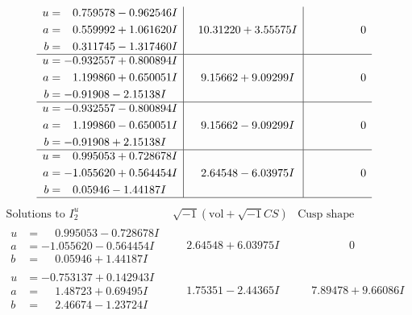 \documentclass[1p]{elsarticle_modified}
\theoremstyle{definition}
\newcommand{\I}{\sqrt{-1}}
\begin{document}
$$\begin{array}{c|c|c}
\begin{aligned}
u &= \phantom{-}0.759578 - 0.962546 I \\
a &= \phantom{-}0.559992 + 1.061620 I \\
b &= \phantom{-}0.311745 - 1.317460 I\end{aligned}
 & \phantom{-}10.31220 + 3.55575 I & \phantom{-0.000000 } 0 \\ \hline\begin{aligned}
u &= -0.932557 + 0.800894 I \\
a &= \phantom{-}1.199860 + 0.650051 I \\
b &= -0.91908 - 2.15138 I\end{aligned}
 & \phantom{-}9.15662 + 9.09299 I & \phantom{-0.000000 } 0 \\ \hline\begin{aligned}
u &= -0.932557 - 0.800894 I \\
a &= \phantom{-}1.199860 - 0.650051 I \\
b &= -0.91908 + 2.15138 I\end{aligned}
 & \phantom{-}9.15662 - 9.09299 I & \phantom{-0.000000 } 0 \\ \hline\begin{aligned}
u &= \phantom{-}0.995053 + 0.728678 I \\
a &= -1.055620 + 0.564454 I \\
b &= \phantom{-}0.05946 - 1.44187 I\end{aligned}
 & \phantom{-}2.64548 - 6.03975 I & \phantom{-0.000000 } 0\\
 \hline 
 \end{array}$$\newpage$$\begin{array}{c|c|c}  
\text{Solutions to }I^u_{2}& \I (\text{vol} + \sqrt{-1}CS) & \text{Cusp shape}\\
 \hline 
\begin{aligned}
u &= \phantom{-}0.995053 - 0.728678 I \\
a &= -1.055620 - 0.564454 I \\
b &= \phantom{-}0.05946 + 1.44187 I\end{aligned}
 & \phantom{-}2.64548 + 6.03975 I & \phantom{-0.000000 } 0 \\ \hline\begin{aligned}
u &= -0.753137 + 0.142943 I \\
a &= \phantom{-}1.48723 + 0.69495 I \\
b &= \phantom{-}2.46674 - 1.23724 I\end{aligned}
 & \phantom{-}1.75351 - 2.44365 I & \phantom{-}7.89478 + 9.66086 I \\ \hline\begin{aligned}

\end{aligned}
\end{array}$$
\end{document}
